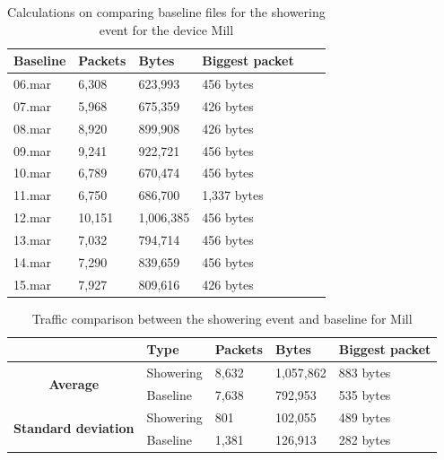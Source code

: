 \begin{table}[H]
    \centering
    \caption{Calculations on comparing baseline files for the showering event for the device Mill}
    \begin{tabular}{|l|l|l|l|l|l|}
    \hline
        \textbf{Baseline} & \textbf{Packets} & \textbf{Bytes} & \textbf{Biggest packet} \\ \hline
        06.mar & 6,308  & 623,993   & 456 bytes \\ \hline
        07.mar & 5,968  & 675,359   & 426 bytes \\ \hline
        08.mar & 8,920  & 899,908   & 426 bytes \\ \hline
        09.mar & 9,241  & 922,721   & 456 bytes \\ \hline
        10.mar & 6,789  & 670,474   & 456 bytes \\ \hline
        11.mar & 6,750  & 686,700   & 1,337 bytes \\ \hline
        12.mar & 10,151 & 1,006,385 & 456 bytes \\ \hline
        13.mar & 7,032  & 794,714   & 456 bytes \\ \hline
        14.mar & 7,290  & 839,659   & 456 bytes \\ \hline
        15.mar & 7,927  & 809,616   & 426 bytes \\ \hline
    \end{tabular}
    \label{tab:MillBaselineShowerCalculations}
\end{table}

\begin{table}[H]
    \centering
    \caption{Traffic comparison between the showering event and baseline for Mill}
    \begin{tabular}{c|l|l|l|l|}
        \cline{2-5}
        \multicolumn{1}{l|}{}                                              & \textbf{Type} & \textbf{Packets} & \textbf{Bytes} & \textbf{Biggest packet} \\ \hline
        \multicolumn{1}{|c|}{\multirow{2}{*}{\textbf{Average}}}            & Showering         & 8,632            & 1,057,862       & 883 bytes               \\ \cline{2-5} 
        \multicolumn{1}{|c|}{}                                             & Baseline      & 7,638            & 792,953         & 535 bytes                \\ \hline
        \multicolumn{1}{|c|}{\multirow{2}{*}{\textbf{Standard deviation}}} & Showering         & 801              & 102,055         & 489 bytes                 \\ \cline{2-5} 
        \multicolumn{1}{|c|}{}                                             & Baseline      & 1,381            & 126,913       
          &  282 bytes               \\ \hline          
    \end{tabular}
    \label{tab:MillComparingBaselineAndShowerCalculations}
\end{table}

